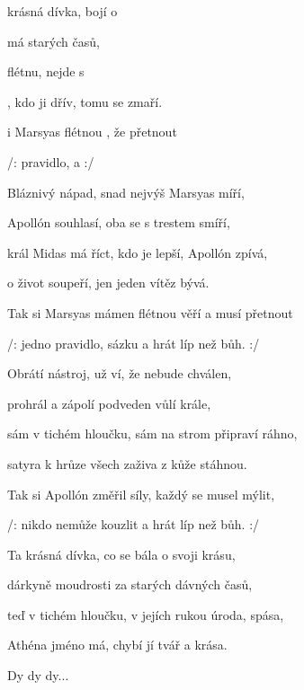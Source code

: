 

\zs
{} krásná dívka,  bojí o  

  má  starých  časů,

 flétnu,  nejde s  

, kdo ji  dřív, {tomu} se  zmaří.
\ks

\zr
{} i Marsyas  flétnou , že  přetnout

/:  pravidlo,  a     :/
\kr

\zs
Bláznivý nápad, snad nejvýš Marsyas míří,

Apollón souhlasí, oba se s trestem smíří,

král Midas má říct, kdo je lepší, Apollón zpívá,

o život soupeří, jen jeden vítěz bývá.
\ks

\zr
Tak si Marsyas mámen flétnou věří a musí přetnout

/: jedno pravidlo, sázku a hrát líp než bůh. :/
\kr

\zs
Obrátí nástroj, už ví, že nebude chválen,

prohrál a zápolí podveden vůlí krále,

sám v tichém hloučku, sám na strom připraví ráhno,

satyra k hrůze všech zaživa z kůže stáhnou.
\ks

\zr
Tak si Apollón změřil síly, každý se musel mýlit,

/: nikdo nemůže kouzlit a hrát líp než bůh. :/
\kr

\zs
Ta krásná dívka, co se bála o svoji krásu,

dárkyně moudrosti za starých dávných časů,

teď v tichém hloučku, v jejích rukou úroda, spása,

Athéna jméno má, chybí jí tvář a krása.
\ks

\zr
Dy dy dy...
\kr

\kp
